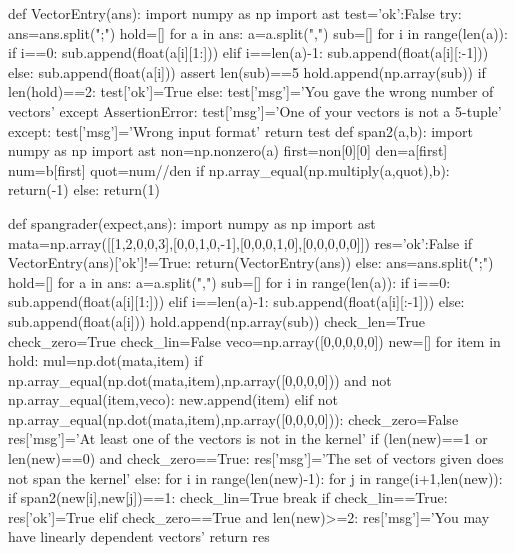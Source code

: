 
\begin{edXscript}

def VectorEntry(ans):
    import numpy as np
    import ast
    test={'ok':False}
    try:
        ans=ans.split(";")
        hold=[]
        for a in ans:
            a=a.split(",")
            sub=[]
            for i in range(len(a)):
                if i==0:
                    sub.append(float(a[i][1:]))
                elif i==len(a)-1:
                    sub.append(float(a[i][:-1]))
                else:
                    sub.append(float(a[i]))
            assert len(sub)==5
            hold.append(np.array(sub))
        if len(hold)==2:
            test['ok']=True
        else:
            test['msg']='You gave the wrong number of vectors'        
    except AssertionError:
        test['msg']='One of your vectors is not a 5-tuple'
    except:
        test['msg']='Wrong input format'
    return test  
def span2(a,b):
    import numpy as np
    import ast
    non=np.nonzero(a)
    first=non[0][0]
    den=a[first]
    num=b[first]
    quot=num//den
    if np.array_equal(np.multiply(a,quot),b):
        return(-1)
    else:
        return(1)
        
def spangrader(expect,ans):
    import numpy as np
    import ast
    mata=np.array([[1,2,0,0,3],[0,0,1,0,-1],[0,0,0,1,0],[0,0,0,0,0]])
    res={'ok':False}
    if VectorEntry(ans)['ok']!=True:
        return(VectorEntry(ans))
    else:
        ans=ans.split(";")
        hold=[]
        for a in ans:
            a=a.split(",")
            sub=[]
            for i in range(len(a)):
                if i==0:
                    sub.append(float(a[i][1:]))
                elif i==len(a)-1:
                    sub.append(float(a[i][:-1]))
                else:
                    sub.append(float(a[i]))
            hold.append(np.array(sub))
        check_len=True
        check_zero=True
        check_lin=False
        veco=np.array([0,0,0,0,0])
        new=[]
        for item in hold:
            mul=np.dot(mata,item)
            if np.array_equal(np.dot(mata,item),np.array([0,0,0,0])) and not np.array_equal(item,veco):
                new.append(item)
            elif not np.array_equal(np.dot(mata,item),np.array([0,0,0,0])):
                check_zero=False
                res['msg']='At least one of the vectors is not in the kernel'
        if (len(new)==1 or len(new)==0) and check_zero==True:
            res['msg']='The set of vectors given does not span the kernel'
        else:
            for i in range(len(new)-1):
                for j in range(i+1,len(new)):
                    if span2(new[i],new[j])==1:
                        check_lin=True
                        break
            if check_lin==True:
                res['ok']=True
            elif check_zero==True and len(new)>=2:
                res['msg']='You may have linearly dependent vectors'
        return res

\end{edXscript}

